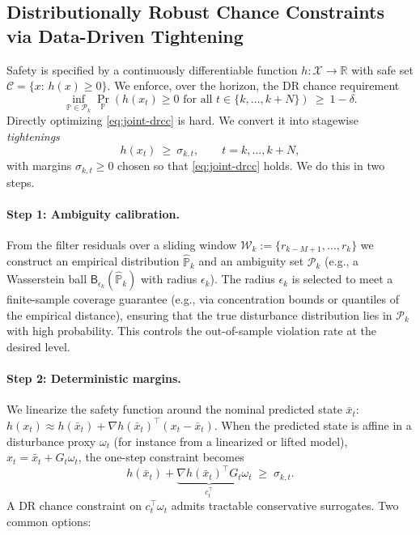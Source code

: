 \documentclass[journal]{IEEEtran}
\theoremstyle{definition}
\begin{document}
\subsection{Distributionally Robust Chance Constraints via Data-Driven Tightening}
\label{subsec:drcc}
Safety is specified by a continuously differentiable function $h:\mathcal{X}\to\mathbb{R}$ with safe set
$\mathcal{C}=\{x:\,h(x)\ge 0\}$. We enforce, over the horizon, the DR chance requirement
\begin{equation}
\inf_{\mathbb{P}\in\mathcal{P}_k}
\Pr_{\mathbb{P}}\!\left(h(x_t)\ge 0 \text{ for all } t\in\{k,\dots,k+N\}\right)\ \ge\ 1-\delta.
\label{eq:joint-drcc}
\end{equation}
Directly optimizing \eqref{eq:joint-drcc} is hard. We convert it into stagewise \emph{tightenings}
\begin{equation}
h(x_t)\ \ge\ \sigma_{k,t},\qquad t=k,\dots,k+N,
\label{eq:tightening}
\end{equation}
with margins $\sigma_{k,t}\ge 0$ chosen so that \eqref{eq:joint-drcc} holds. We do this in two steps.

\paragraph*{Step 1: Ambiguity calibration.}
From the filter residuals over a sliding window $\mathcal{W}_k:=\{r_{k-M+1},\dots,r_k\}$ we construct
an empirical distribution $\widehat{\mathbb{P}}_k$ and an ambiguity set $\mathcal{P}_k$ (e.g., a Wasserstein
ball $\mathsf{B}_{\epsilon_k}(\widehat{\mathbb{P}}_k)$ with radius $\epsilon_k$). The radius $\epsilon_k$
is selected to meet a finite-sample coverage guarantee (e.g., via concentration bounds or quantiles of the
empirical distance), ensuring that the true disturbance distribution lies in $\mathcal{P}_k$ with high
probability. This controls the out-of-sample violation rate at the desired level.

\paragraph*{Step 2: Deterministic margins.}
We linearize the safety function around the nominal predicted state $\bar{x}_t$:
$h(x_t)\approx h(\bar{x}_t)+\nabla h(\bar{x}_t)^\top (x_t-\bar{x}_t)$.
When the predicted state is affine in a disturbance proxy $\omega_t$ (for instance from a linearized
or lifted model), $x_t=\bar{x}_t+G_t\omega_t$, the one-step constraint becomes
\[
h(\bar{x}_t)+\underbrace{\nabla h(\bar{x}_t)^\top G_t}_{c_t^\top}\omega_t \;\ge\; \sigma_{k,t}.
\]
A DR chance constraint on $c_t^\top\omega_t$ admits tractable conservative surrogates. Two common options:
\end{document}
